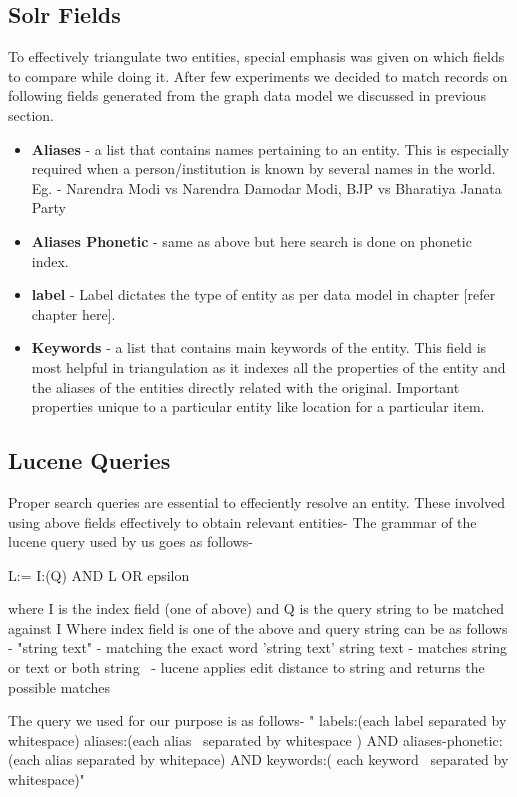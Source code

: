 \subsection{Solr Fields}
    To effectively triangulate two entities, special emphasis was given on which fields to compare while doing it. After few experiments we decided to match records on following fields generated from the graph data model we discussed in previous section.

\begin{itemize}
    \item \textbf{ Aliases }- a list that contains names pertaining to an entity. This is especially required when a person/institution is known by several names in the world. Eg. - Narendra Modi vs Narendra Damodar Modi, BJP vs Bharatiya Janata Party 
    \item \textbf{ Aliases  Phonetic } - same as above but here search is done on phonetic index.
    \item \textbf{ label } - Label dictates the type of entity as per data model in chapter [refer chapter here].
    \item \textbf{ Keywords } - a list that contains main keywords of the entity. This field is most helpful in triangulation as it indexes all the properties of the entity and the aliases of the entities directly related with the original. Important properties unique to a particular entity like location for a particular item.
\end{itemize}

\subsection{Lucene Queries}
    Proper search queries are essential to effeciently resolve an entity. These involved using above fields effectively to obtain relevant entities- 
    The grammar of the lucene query used by us goes as follows-

    L:= I:(Q) AND L OR epsilon

    where I is the index field (one of above) and Q is the query string to be matched against I
    Where index field is one of the above and query string can be as follows -
    "string text" - matching the exact word 'string text'
    string text - matches string or text or both
    string~ - lucene applies edit distance to string and returns the possible matches

    The query we used for our purpose is as follows-
    " labels:(each label separated by whitespace) aliases:(each alias~ separated by whitespace ) AND aliases-phonetic:(each alias separated by whitepace) AND keywords:( each keyword~ separated by whitespace)"

